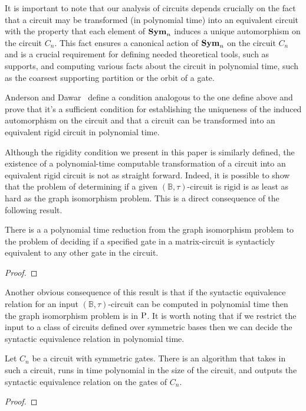 \documentclass[../paper.tex]{subfiles}
\begin{document}
It is important to note that our analysis of circuits depends crucially on the
fact that a circuit may be transformed (in polynomial time) into an equivalent
circuit with the property that each element of $\text{\textbf{Sym}}_n$ induces a unique
automorphism on the circuit $C_n$. This fact ensures a canonical action of
$\text{\textbf{Sym}}_n$ on the circuit $C_n$ and is a crucial requirement for defining needed
theoretical tools, such as supports, and computing various facts about the
circuit in polynomial time, such as the coarsest supporting partition or the
orbit of a gate.

Anderson and Dawar~\cite{AndersonD17} define a condition analogous to the one
define above and prove that it's a sufficient condition for establishing the
uniqueness of the induced automorphism on the circuit and that a circuit can be
transformed into an equivalent rigid circuit in polynomial time.

Although the rigidity condition we present in this paper is similarly defined,
the existence of a polynomial-time computable transformation of a circuit into
an equivalent rigid circuit is not as straight forward. Indeed, it is possible
to show that the problem of determining if a given $(\mathbb{B}, \tau)$-circuit
is rigid is as least as hard as the graph isomorphism problem. This is a direct
consequence of the following result.

\begin{prop}
  There is a a polynomial time reduction from the graph isomorphism problem to
  the problem of deciding if a specified gate in a matrix-circuit is syntacticly
  equivalent to any other gate in the circuit.
  \label{prop:syntactic-graph-iso}
\end{prop}
\begin{proof}
\end{proof}

Another obvious consequence of this result is that if the syntactic equivalence
relation for an input $(\mathbb{B}, \tau)$-circuit can be computed in polynomial
time then the graph isomorphism problem is in $\mathrm{P}$. It is worth noting that if
we restrict the input to a class of circuits defined over symmetric bases then
we can decide the syntactic equivalence relation in polynomial time.

\begin{prop}
  Let $C_n$ be a circuit with symmetric gates. There is an algorithm that takes
  in such a circuit, runs in time polynomial in the size of the circuit, and
  outputs the syntactic equivalence relation on the gates of $C_n$.
  \label{prop:symmetric-syntactic}
\end{prop}
\begin{proof}
\end{proof}
\end{document}
